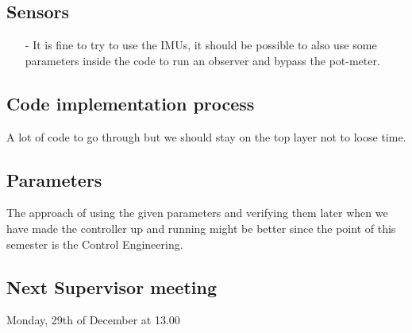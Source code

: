 \subsection{Sensors}
\begin{itemize}
\item[-] It is fine to try to use the IMUs, it should be possible to also use some parameters inside the code to run an observer and bypass the pot-meter.
\end{itemize}

\subsection{Code implementation process}
A lot of code to go through but we should stay on the top layer not to loose time.

\subsection{Parameters}
The approach of using the given parameters and verifying them later when we have made the controller up and running might be better since the point of this semester is the Control Engineering.

\subsection{Next Supervisor meeting}
Monday, 29th of December at 13.00




